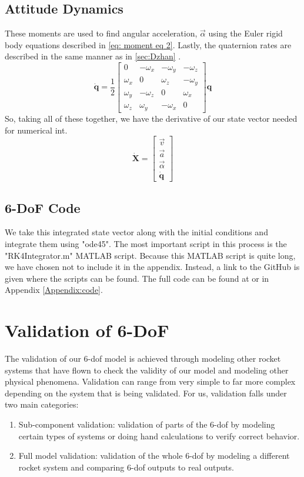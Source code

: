 \documentclass[10pt, openany, titlepage]{book}
\theoremstyle{definition}
\let\oldautoref\autoref
\renewcommand{\autoref}[1]{%
  \begingroup
  \hypersetup{linkcolor=black}%
  \oldautoref{#1}%
  \endgroup
}
\begin{document}
\subsection{Attitude Dynamics}
These moments are used to find angular acceleration, $\vec{\alpha}$ using the Euler \gls{rigid body} equations described in \eqref{eq: moment eq 2}. Lastly, the \gls{quaternion} rates are described in the same manner as in \autoref{sec:Dzhan}.
\begin{equation}
    \dot{\mathbf{q}}=\frac{1}{2}\begin{bmatrix}
        0&-\omega_x&-\omega_y&-\omega_z\\
        \omega_x&0&\omega_z&-\omega_y\\
        \omega_y&-\omega_z&0&\omega_x\\
        \omega_z&\omega_y&-\omega_x&0
    \end{bmatrix}\mathbf{q}
\end{equation}
So, taking all of these together, we have the derivative of our \gls{state vector} needed for \gls{numerical int}.
\begin{equation}
    \dot{\textbf{X}}=\begin{bmatrix}
        \vec{v}\\\vec{a}\\\vec{\alpha}\\\dot{\textbf{q}}
    \end{bmatrix}
\end{equation}
\subsection{6-DoF Code}
We take this integrated \gls{state vector} along with the initial conditions and integrate them using "ode45". The most important script in this process is the "RK4Integrator.m" MATLAB script. Because this MATLAB script is quite long, we have chosen not to include it in the appendix. Instead, a link to the GitHub is given where the scripts can be found. The full code can be found at \cite{reynolds_hudsonreynoldsflight-dynamics-bible_nodate} or in Appendix \ref{Appendix:code}.

\section{Validation of 6-DoF}
The validation of our 6-\gls{dof} model is achieved through modeling other rocket systems that have flown to check the validity of our model and modeling other physical phenomena. Validation can range from very simple to far more complex depending on the system that is being validated. For us, validation falls under two main categories:
\begin{enumerate}
    \item Sub-component validation: validation of parts of the 6-\gls{dof} by modeling certain types of systems or doing hand calculations to verify correct behavior.
    \item Full model validation: validation of the whole 6-\gls{dof} by modeling a different rocket system and comparing 6-\gls{dof} outputs to real outputs.
\end{enumerate}
\end{document}
